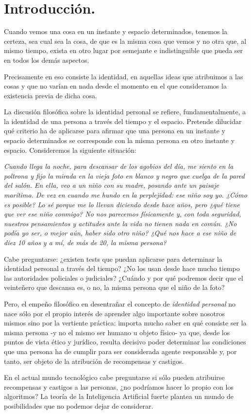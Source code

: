 \documentclass[main.tex]{subfiles}
\begin{document}
	
	\chapter*{Introducción.}

	Cuando vemos una cosa en un instante y espacio determinados, tenemos la certeza, sea cual sea la cosa, de que es la misma cosa que vemos y no otra que, al mismo tiempo, exista en otro lugar por semejante e indistinguible que pueda ser en todos los demás aspectos.

	Precisamente en eso consiste la identidad, en aquellas ideas que atribuimos a las cosas y que no varían en nada desde el momento en el que consideramos la existencia previa de dicha cosa. 

	La discusión filosófica sobre la identidad personal se refiere, fundamentalmente, a la identidad de una persona a través del tiempo y el espacio. Pretende dilucidar qué criterio ha de aplicarse para afirmar que una persona en un instante y espacio determinados se corresponde con la misma persona en otro instante y espacio. Consideremos la siguiente situación:

	\textit{Cuando llega la noche, para descansar de los agobios del día, me siento en la poltrona y fijo la mirada en la vieja foto en blanco y negro que cuelga de la pared del salón. En ella, veo a un niño con su madre, posando ante un paisaje marítimo. De vez en cuando me hundo en la perplejidad: ese niño soy yo. ¿Cómo es posible? Lo sé porque me lo llevan diciendo desde hace años, pero ¿qué tiene que ver ese niño conmigo? No nos parecemos físicamente y, con toda seguridad, nuestros pensamientos y actitudes ante la vida no tienen nada en común. ¿No podía yo ser, o mejor aún, haber sido otro niño? ¿Qué nos hace a ese niño de diez 10 años y a mí, de más de 20, la misma persona?}
	
	
	Cabe preguntarse: ¿existen tests que puedan aplicarse para determinar la identidad personal a través del tiempo? ¿No los usan desde hace mucho tiempo las autoridades policiales o judiciales? ¿Cuándo y por qué podremos decir que el veinteñero que descansa es, o no, la misma persona que el niño de la foto?
	
	Pero, el empeño filosófico en desentrañar el concepto de \textit{identidad personal} no nace sólo por el propio interés de aprender algo importante sobre nosotros mismos sino por la vertiente práctica: importa mucho saber en qué consiste ser la misma persona -y no el mismo ser humano u objeto físico- ya que, desde los puntos de vista ético y jurídico, resulta decisivo poder determinar las condiciones que una persona ha de cumplir para ser considerada agente responsable y, por tanto, ser objeto de la atribución de recompensas y castigos.
 
	
 	En el actual mundo tecnológico cabe preguntarse si sólo pueden atribuirse recompensas y castigos a las personas, ¿no podríamos hacer lo propio con los algoritmos? La teoría de la Inteligencia Artificial fuerte plantea un mundo de posibilidades que no podemos dejar de considerar.
	
    
	
\end{document}
